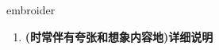 
\begin{frame}
{\huge embroider}
\begin{center}
\begin{enumerate}\Large
  \item \textbf{(时常伴有夸张和想象内容地)详细说明}
\end{enumerate}
\end{center}
\end{frame}
